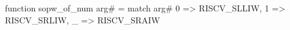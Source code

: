 function sopw_of_num arg# = match arg# {
  0 => RISCV_SLLIW,
  1 => RISCV_SRLIW,
  _ => RISCV_SRAIW
}
